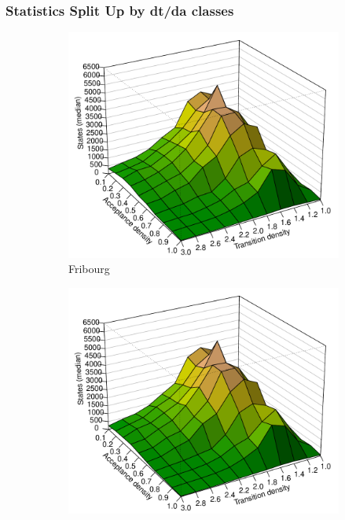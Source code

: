 % 

\subsubsection{Statistics Split Up by dt/da classes}

\newcommand{\perspwidth}{0.475}

\begin{figure}[ht]
\centering
  \hfill
  \begin{subfigure}[t]{\perspwidth\textwidth}
  \centering
  \includegraphics[width=\textwidth]{figures/r/internal/goal/s.median.Fribourg.pdf}
  \caption{Fribourg}
  \end{subfigure}
  \hfill
  \begin{subfigure}[t]{\perspwidth\textwidth}
  \centering
  \includegraphics[width=\textwidth]{figures/r/internal/goal/s.median.Fribourg+R2C.pdf}

\end{subfigure}
\end{figure}
